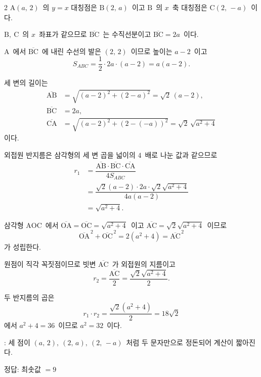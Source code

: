 \documentclass[10pt,fleqn]{article}
\begin{document}
\begin{multicols*}{2}
$\mathrm{A}(a,\, 2)$\ 의 $y = x$ 대칭점은 $\mathrm{B}(2,\, a)$\ 이고 $\mathrm{B}$\ 의 $x$\ 축 대칭점은 $\mathrm{C}(2,\, -a)$\ 이다.

$\mathrm{B},\ \mathrm{C}$\ 의 $x$\ 좌표가 같으므로 $\overline{\mathrm{BC}}$\ 는 수직선분이고 $\overline{\mathrm{BC}} = 2a$\ 이다.

$\mathrm{A}$\ 에서 $\overline{\mathrm{BC}}$\ 에 내린 수선의 발은 $(2,\, 2)$\ 이므로 높이는 $a - 2$\ 이고
\[ S_{ABC} = \dfrac{1}{2} \cdot 2a \cdot (a - 2) = a(a - 2). \]

세 변의 길이는
\begin{align*}
  \overline{\mathrm{AB}} &= \sqrt{(a - 2)^2 + (2 - a)^2} = \sqrt{2}\, (a - 2),\\
  \overline{\mathrm{BC}} &= 2a,\\
  \overline{\mathrm{CA}} &= \sqrt{(a - 2)^2 + (2 - (-a))^2} = \sqrt{2}\, \sqrt{a^2 + 4}
\end{align*}
이다.

외접원 반지름은 삼각형의 세 변 곱을 넓이의 $4$\ 배로 나눈 값과 같으므로
\begin{align*}
  r_1 &= \dfrac{\overline{\mathrm{AB}} \cdot \overline{\mathrm{BC}} \cdot \overline{\mathrm{CA}}}{4 S_{ABC}} \\
      &= \dfrac{\sqrt{2}(a - 2) \cdot 2a \cdot \sqrt{2}\sqrt{a^2 + 4}}{4 a(a - 2)} \\
      &= \sqrt{a^2 + 4}.
\end{align*}

삼각형 $\mathrm{AOC}$\ 에서 $\overline{\mathrm{OA}} = \overline{\mathrm{OC}} = \sqrt{a^2 + 4}$\ 이고 $\overline{\mathrm{AC}} = \sqrt{2}\sqrt{a^2 + 4}$\ 이므로
\[ \overline{\mathrm{OA}}^{\,2} + \overline{\mathrm{OC}}^{\,2} = 2(a^2 + 4) = \overline{\mathrm{AC}}^{\,2} \]
가 성립한다.

원점이 직각 꼭짓점이므로 빗변 $\overline{\mathrm{AC}}$\ 가 외접원의 지름이고
\[ r_2 = \dfrac{\overline{\mathrm{AC}}}{2} = \dfrac{\sqrt{2}\sqrt{a^2 + 4}}{2}. \]

두 반지름의 곱은
\[ r_1 \cdot r_2 = \dfrac{\sqrt{2}(a^2 + 4)}{2} = 18\sqrt{2} \]
에서 $a^2 + 4 = 36$\ 이므로 $a^2 = 32$\ 이다.

\begin{dmcriticalpoint}
: 세 점이 $(a,\, 2),\ (2,\, a),\ (2,\, -a)$\ 처럼 두 문자만으로 정돈되어 계산이 짧아진다.
\end{dmcriticalpoint}

\begin{dmanswerbox}
정답: 최솟값 $=9$
\end{dmanswerbox}


\end{multicols*}
\end{document}
